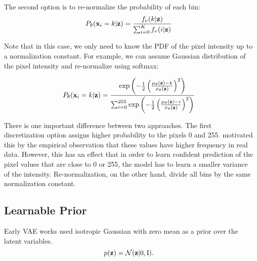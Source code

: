 The second option is to re-normalize the probability of each bin:
\begin{equation}\label{eq:intro_softmax_discr}
\begin{aligned}
    P_{\theta}(\rvx_i = k|\rvz) = \frac{f_{\nu}(k|\rvz)}{\sum_{i=0}^K f_{\nu}(i|\rvz)}
\end{aligned}
\end{equation}

Note that in this case, we only need to know the PDF of the pixel intensity up to a normalization constant. For example, we can assume Gaussian distribution of the pixel intensity and re-normalize using softmax:

\begin{equation}
\begin{aligned}
    P_{\theta}({\mathbf{x}}_i = k|{\mathbf{z}}) = \frac{\exp\left(-\frac12 \left(\frac{\mu_{\theta}({\mathbf{z}}) - k}{\sigma_{\theta}({\mathbf{z}})}\right)^2\right)}{\sum_{i=0}^{255} \exp\left(-\frac12 \left(\frac{\mu_{\theta}({\mathbf{z}}) - i}{\sigma_{\theta}({\mathbf{z}})}\right)^2\right)}
\end{aligned}
\end{equation}

There is one important difference between two approaches. The first discretization option assigns higher probability to the pixels 0 and 255. \citet{salimans2016improved} motivated this by the empirical observation that these values have higher frequency in real data. However, this has an effect that in order to learn confident prediction of the pixel values that are close to 0 or 255, the model has to learn a smaller variance of the intensity. Re-normalization, on the other hand, divide all bins by the same normalization constant.







\subsection{Learnable Prior}
Early VAE works used isotropic Gaussian with zero mean as a prior over the latent variables.
\begin{equation}
    p({\mathbf{z}}) = \mathcal{N}({\mathbf{z}} | 0, \text{I}).
\end{equation}

